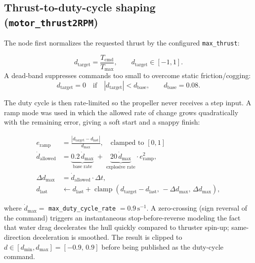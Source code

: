 \subsection{Thrust-to-duty-cycle shaping (\texttt{motor\_thrust2RPM})}

The node first normalizes the requested thrust by the configured \texttt{max\_thrust}:

\begin{equation}
d_{\text{target}} = \frac{T_{\text{cmd}}}{T_{\max}}, \qquad d_{\text{target}} \in [-1,1].
\end{equation}
A dead-band suppresses commands too small to overcome static friction/cogging:
\begin{equation}
d_{\text{target}} = 0 \quad \text{if} \quad |d_{\text{target}}| < d_{\text{base}}, \qquad d_{\text{base}} = 0.08.
\end{equation}

The duty cycle is then rate-limited so the propeller never receives a step input.
A ramp mode was used in which the allowed rate of change grows quadratically with the remaining error, giving a soft start and a snappy finish:

\begin{align}
e_{\text{ramp}} &= \frac{|d_{\text{target}} - d_{\text{last}}|}{d_{\max}}, \quad \text{clamped to } [0,1] \\
\dot d_{\text{allowed}} &= \underbrace{0.2\, \dot d_{\max}}_{\text{base rate}} \;+\; \underbrace{20\, \dot d_{\max}}_{\text{explosive rate}} \cdot e_{\text{ramp}}^2, \\
\Delta d_{\max} &= \dot d_{\text{allowed}} \cdot \Delta t, \\
d_{\text{last}} &\leftarrow d_{\text{last}} + \operatorname{clamp}(d_{\text{target}}-d_{\text{last}},\,-\Delta d_{\max},\,\Delta d_{\max}),
\end{align}

where $\dot d_{\max}=$ \texttt{max\_duty\_cycle\_rate} $=0.9\,\text{s}^{-1}$. A zero-crossing (sign reversal of the command) triggers an instantaneous stop-before-reverse modeling the fact that water drag decelerates the hull quickly compared to thruster spin-up; same-direction deceleration is smoothed. The result is clipped to $d\in[d_{\min},d_{\max}]=[-0.9,\,0.9]$ before being published as the duty-cycle command.

